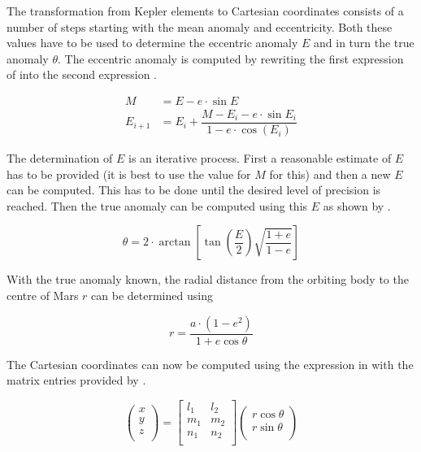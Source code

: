 The transformation from Kepler elements to Cartesian coordinates consists of a number of steps starting with the mean anomaly and eccentricity. Both these values have to be used to determine the eccentric anomaly $E$ and in turn the true anomaly $\theta$. The eccentric anomaly is computed by rewriting the first expression of  into the second expression \cite{noomen2013basic}. 



\begin{equation}\label{eq:mandecomp}
\begin{split}
 M&=E-e\cdot\sin{E}\\
 E_{i+1}&=E_{i}+\dfrac{M-E_{i}-e\cdot\sin{E_{i}}}{1-e\cdot\cos(E_{i})}
\end{split}
\end{equation}


The determination of $E$ is an iterative process. First a reasonable estimate of $E$ has to be provided (it is best to use the value for $M$ for this) and then a new $E$ can be computed. This has to be done until the desired level of precision is reached. Then the true anomaly can be computed using this $E$ as shown by .

\begin{equation}\label{eq:etothetacomp}
\theta=2\cdot\arctan\left[\tan\left(\dfrac{E}{2}\right)\sqrt{\dfrac{1+e}{1-e}}\right]
\end{equation}

With the true anomaly known, the radial distance from the orbiting body to the centre of Mars $r$ can be determined using 

\begin{equation}\label{eq:radiuscomp}
r=\dfrac{a\cdot(1-e^{2})}{1+e\cos\theta }
\end{equation}

The Cartesian coordinates can now be computed using the expression in  with the matrix entries provided by \cite{noomen2013basic}. 

\begin{equation}\label{eq:keptocartmat}
\begin{pmatrix}
x\\
y\\
z\\
\end{pmatrix}=
\begin{bmatrix}
l_{1} & l_{2}\\
m_{1} & m_{2}\\
n_{1} & n_{2}\\
\end{bmatrix}
\begin{pmatrix}
r\cos\theta \\
r\sin\theta \\
\end{pmatrix}
\end{equation}

